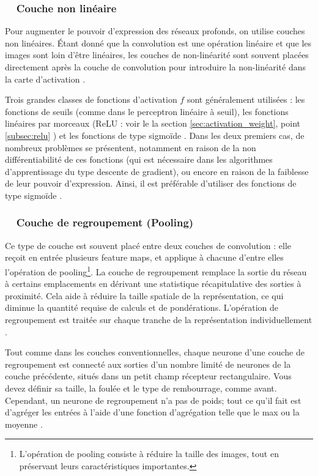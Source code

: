 

\subsubsection*{\qquad \textbullet \ \ Couche non linéaire}

Pour augmenter le pouvoir d'expression des réseaux profonds, on utilise couches non linéaires\cite{antoine2018apprentissage}.
Étant donné que la convolution est une opération linéaire et que les images sont loin d'être linéaires, les couches de non-linéarité sont souvent placées directement après la couche de convolution pour introduire la non-linéarité dans la carte d'activation \cite{goodfellow2016deep}.

Trois grandes classes de fonctions d'activation $f$ sont généralement utilisées : les fonctions de seuils (comme dans le perceptron linéaire à seuil), les fonctions linéaires par morceaux (ReLU : voir le la section \ref{sec:activation_weight}, point \ref{subsec:relu} ) et les fonctions de type sigmoïde \cite{goodfellow2016deep}. Dans les deux premiers cas, de nombreux problèmes se présentent, notamment en raison de la non différentiabilité de ces fonctions (qui est nécessaire dans les algorithmes d'apprentissage du type descente de gradient), ou encore en raison de la faiblesse de leur pouvoir d'expression. Ainsi, il est préférable d'utiliser des fonctions de type sigmoïde \cite{antoine2018apprentissage}.


\subsubsection*{\qquad \textbullet \ \ Couche de regroupement (Pooling)}
Ce type de couche est souvent placé entre deux couches de convolution : elle reçoit en entrée plusieurs feature maps, et applique à chacune d'entre elles l'opération de pooling\footnote{L'opération de pooling consiste à réduire la taille des images, tout en préservant leurs caractéristiques importantes.}. La couche de regroupement remplace la sortie du réseau à certains emplacements en dérivant une statistique récapitulative des sorties à proximité. Cela aide à réduire la taille spatiale de la représentation, ce qui diminue la quantité requise de calculs et de pondérations. L'opération de regroupement est traitée sur chaque tranche de la représentation individuellement \cite{goodfellow2016deep}. 

Tout comme dans les couches conventionnelles, chaque neurone d'une couche de regroupement est connecté aux sorties d'un nombre limité de neurones de la couche précédente, situés dans un petit champ récepteur rectangulaire. Vous devez définir sa taille, la foulée et le type de rembourrage, comme avant. Cependant, un neurone de regroupement n'a pas de poids; tout ce qu'il fait est d'agréger les entrées à l'aide d'une fonction d'agrégation telle que le max ou la moyenne \cite{geron2017hands}.

